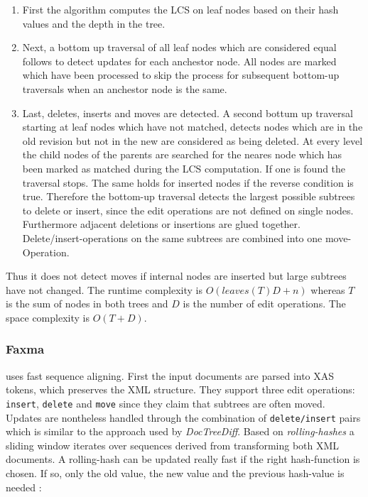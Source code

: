 \begin{enumerate}
\item First the algorithm computes the LCS on leaf nodes based on their hash values and the depth in the tree.
\item Next, a bottom up traversal of all leaf nodes which are considered equal follows to detect updates for each anchestor node. All nodes are marked which have been processed to skip the process for subsequent bottom-up traversals when an anchestor node is the same.
\item Last, deletes, inserts and moves are detected. A second bottum up traversal starting at leaf nodes which have not matched, detects nodes which are in the old revision but not in the new are considered as being deleted. At every level the child nodes of the parents are searched for the neares node which has been marked as matched during the LCS computation. If one is found the traversal stops. The same holds for inserted nodes if the reverse condition is true. Therefore the bottom-up traversal detects the largest possible subtrees to delete or insert, since the edit operations are not defined on single nodes. Furthermore adjacent deletions or insertions are glued together. Delete/insert-operations on the same subtrees are combined into one move-Operation.
\end{enumerate}

Thus it does not detect moves if internal nodes are inserted but large subtrees have not changed. The runtime complexity is $O(leaves(T)D + n)$ whereas $T$ is the sum of nodes in both trees and $D$ is the number of edit operations. The space complexity is $O(T+D)$.

\subsubsection{Faxma\cite{lindholm2006fast}}
uses fast sequence aligning. First the input documents are parsed into XAS tokens, which preserves the XML structure. They support three edit operations: \texttt{insert}, \texttt{delete} and \texttt{move} since they claim that subtrees are often moved. Updates are nontheless handled through the combination of \texttt{delete/insert} pairs which is similar to the approach used by \emph{DocTreeDiff}. Based on \emph{rolling-hashes} a sliding window iterates over sequences derived from transforming both XML documents. A rolling-hash can be updated really fast if the right hash-function is chosen. If so, only the old value, the new value and the previous hash-value is needed \cite{RollingHash}:

